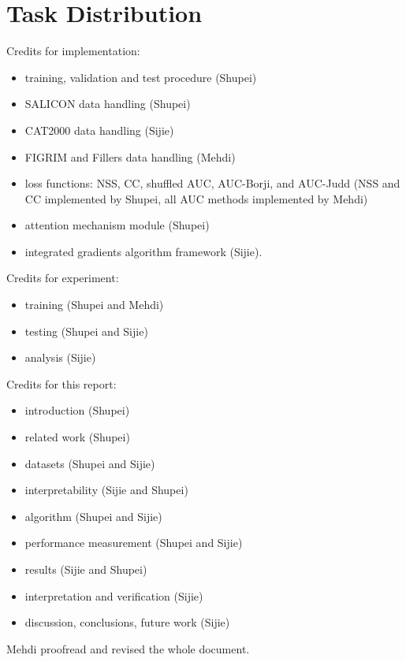 \documentclass[12pt]{article}
\begin{document}

\section{Task Distribution}
Credits for implementation:
\begin{itemize}
    \item training, validation and test procedure (Shupei)
    \item SALICON data handling (Shupei)
    \item CAT2000 data handling (Sijie)
    \item FIGRIM and Fillers data handling (Mehdi)
    \item loss functions: NSS, CC, shuffled AUC, AUC-Borji, and AUC-Judd (NSS and CC implemented by Shupei, all AUC methods implemented by Mehdi)
    \item attention mechanism module (Shupei)
    \item integrated gradients algorithm framework (Sijie).
\end{itemize}

Credits for experiment:
\begin{itemize}
    \item training (Shupei and Mehdi)
    \item testing (Shupei and Sijie)
    \item analysis (Sijie)
\end{itemize}

Credits for this report:
\begin{itemize}
    \item introduction (Shupei)
    \item related work (Shupei)
    \item datasets (Shupei and Sijie)
    \item interpretability (Sijie and Shupei)
    \item algorithm (Shupei and Sijie)
    \item performance measurement (Shupei and Sijie)
    \item results (Sijie and Shupei)
    \item interpretation and verification (Sijie)
    \item discussion, conclusions, future work (Sijie)
\end{itemize}
Mehdi proofread and revised the whole document.

\newpage



\end{document}
